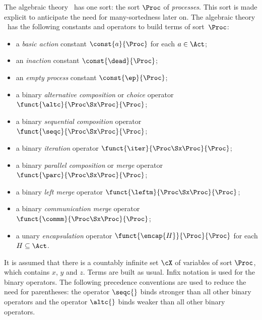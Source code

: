 \documentclass[runningheads]{llncs}
\begin{document}
The algebraic theory \ACPei\ has one sort: the sort $\Proc$ of 
\emph{processes}.
This sort is made explicit to anticipate the need for many-sortedness 
later on. 
%
The algebraic theory \ACPei\ has the following constants and operators 
to build terms of sort~$\Proc$:
\begin{itemize}
\item
a \emph{basic action} constant $\const{a}{\Proc}$ for each 
$a \in \Act$;
\item
an \emph{inaction} constant $\const{\dead}{\Proc}$;
\item
an \emph{empty process} constant $\const{\ep}{\Proc}$;
\item
a binary \emph{alternative composition} or \emph{choice} operator 
$\funct{\altc}{\Proc \Sx \Proc}{\Proc}$;
\item
a binary \emph{sequential composition} operator 
$\funct{\seqc}{\Proc \Sx \Proc}{\Proc}$;
\item
a binary \emph{iteration} operator 
$\funct{\iter}{\Proc \Sx \Proc}{\Proc}$;
\item
a binary \emph{parallel composition} or \emph{merge} operator 
$\funct{\parc}{\Proc \Sx \Proc}{\Proc}$;
\item
a binary \emph{left merge} operator 
$\funct{\leftm}{\Proc \Sx \Proc}{\Proc}$;
\item
a binary \emph{communication merge} operator 
$\funct{\commm}{\Proc \Sx \Proc}{\Proc}$;
\item
a unary \emph{encapsulation} operator 
$\funct{\encap{H}}{\Proc}{\Proc}$ for each $H \subseteq \Act$.
\end{itemize}
%
It is assumed that there is a countably infinite set $\cX$ of variables 
of sort $\Proc$, which contains $x$, $y$ and $z$.
Terms are built as usual.
Infix notation is used for the binary operators.
The following precedence conventions are used to reduce the need for
parentheses: the operator ${} \seqc {}$ binds stronger than all other 
binary operators and the operator ${} \altc {}$ binds weaker than all 
other binary operators.
\end{document}
